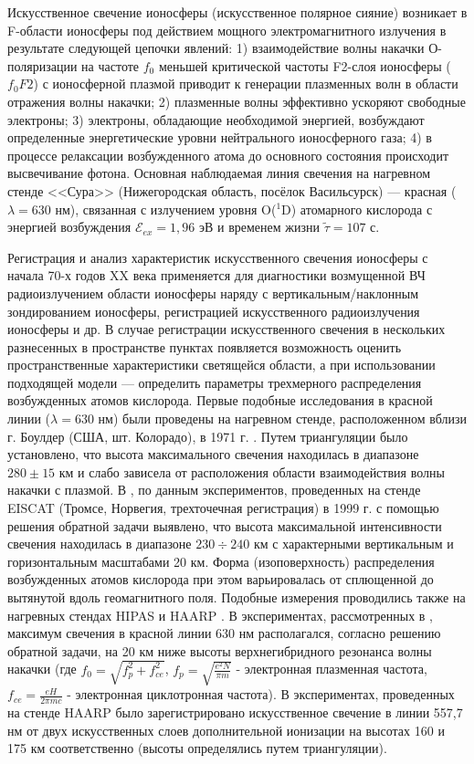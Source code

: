 \documentclass[12pt,a4paper]{article}
\begin{document}
Искусственное свечение ионосферы (искусственное полярное сияние) возникает в F-области ионосферы под действием мощного электромагнитного излучения в результате следующей цепочки явлений: 1) взаимодействие волны накачки О-поляризации на частоте $f_0$ меньшей критической частоты F2-слоя ионосферы ($f_{0}F2$) с ионосферной плазмой приводит к генерации плазменных волн в области отражения волны накачки; 2) плазменные волны эффективно ускоряют свободные электроны; 3) электроны, обладающие необходимой энергией, возбуждают определенные энергетические уровни нейтрального ионосферного газа; 4) в процессе релаксации возбужденного атома до основного состояния происходит высвечивание фотона. Основная наблюдаемая линия свечения на нагревном стенде <<Сура>> (Нижегородская область, посёлок Васильсурск) --- красная ($\lambda = 630$ нм), связанная с излучением уровня O($^1$D) атомарного кислорода с энергией возбуждения $\mathcal{E}_{ex} = 1,96$ эВ и временем жизни $\widetilde{\tau} = 107$ с.

Регистрация и анализ характеристик искусственного свечения ионосферы с начала 70-х годов XX века \cite{BIONDI1970} применяется для диагностики возмущенной ВЧ радиоизлучением области ионосферы наряду с вертикальным/наклонным зондированием ионосферы, регистрацией искусственного радиоизлучения ионосферы и др. В случае регистрации искусственного свечения в нескольких разнесенных в пространстве пунктах появляется возможность оценить пространственные характеристики светящейся области, а при использовании подходящей модели --- определить параметры трехмерного распределения возбужденных атомов кислорода. Первые подобные исследования в красной линии ($\lambda = 630$ нм) были проведены на нагревном стенде, расположенном вблизи г. Боулдер (США, шт. Колорадо), в 1971 г. \cite{HASLETT1974}. Путем триангуляции было установлено, что высота максимального свечения находилась в диапазоне $280\pm15$ км и слабо зависела от расположения области взаимодействия волны накачки с плазмой. В \cite{Gustavsson2001}, по данным экспериментов, проведенных на стенде EISCAT (Тромсе, Норвегия, трехточечная регистрация) в 1999 г. с помощью решения обратной задачи выявлено, что высота максимальной интенсивности свечения находилась в диапазоне $230\div240$ км с характерными вертикальным и горизонтальным масштабами 20 км. Форма (изоповерхность) распределения возбужденных атомов кислорода при этом варьировалась от сплющенной до вытянутой вдоль геомагнитного поля. Подобные измерения проводились также на нагревных стендах HIPAS \cite{Gustavsson2008} и HAARP \cite{Pedersen2011}. В экспериментах, рассмотренных в \cite{Gustavsson2008}, максимум свечения в красной линии 630 нм располагался, согласно решению обратной задачи, на 20 км ниже высоты верхнегибридного резонанса волны накачки (где $f_0 = \sqrt{f_p^2 + f_{ce}^2}$, $f_p=\sqrt{\frac{e^2N}{\pi m}}$ - электронная плазменная частота, $f_{ce}=\frac{e H}{2\pi m c}$ - электронная циклотронная частота). В экспериментах, проведенных на стенде HAARP \cite{Pedersen2011} было зарегистрировано искусственное свечение в линии 557,7 нм от двух искусственных слоев дополнительной ионизации на высотах 160 и 175 км соответственно (высоты определялись путем триангуляции).
\end{document}
